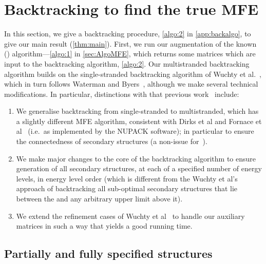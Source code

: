 
\section{Backtracking to find the true MFE}\label{sec:BT}

In this section, we give a backtracking procedure, 
\cref{algo:2} in \cref{app:backalgo}, 
to give our main result (\cref{thm:main}). 
First,  we run our augmentation of the known \symnMFE (\snMFE) algorithm---\cref{algo:1} in \cref{sec:AlgoMFE}, which returns some matrices which are input to the backtracking algorithm, \cref{algo:2}. 
Our multistranded backtracking algorithm builds on the single-stranded backtracking algorithm of Wuchty et al.~\cite{wuchty1999complete},
which in turn follows Waterman and Byers~\cite{waterman1985dynamic}, 
 although we make several technical modifications. 
In particular, distinctions with that previous work~\cite{wuchty1999complete,waterman1985dynamic} include: 
\begin{enumerate}
	\item We generalise backtracking from single-stranded to multistranded, which has a slightly different MFE algorithm, consistent with Dirks et al and Fornace et al~\cite{dirks2007thermodynamic,fornace2020unified} (i.e.~as implemented by the NUPACK software); in particular to ensure  the connectedness of secondary structures (a non-issue for~\cite{wuchty1999complete,waterman1985dynamic}). 
	\item We make major changes to the core of the backtracking algorithm  to ensure generation of all secondary structures, 
	at each of a specified number of energy levels, in energy level order 
	(which is different from the Wuchty et al's~\cite{wuchty1999complete} approach of backtracking all sub-optimal secondary structures that lie between the \snMFE and any arbitrary upper limit above it). 
	\item We extend the refinement cases of  Wuchty et al~\cite{wuchty1999complete} to handle our auxiliary matrices in such a way that yields  a good running time. 
\end{enumerate}

\subsection{Partially and fully specified structures} 



